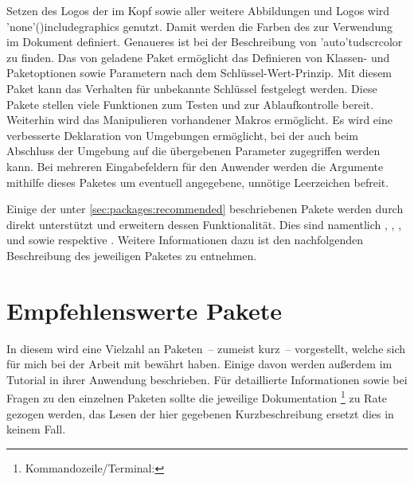 \begin{DeclarePackages}
  Setzen des Logos der \TnUD im Kopf sowie aller weitere Abbildungen und Logos 
  wird \Macro'none'(){includegraphics} genutzt.
  Damit werden die Farben des \CDs zur Verwendung im Dokument definiert. 
  Genaueres ist bei der Beschreibung von \Package'auto'{tudscrcolor} zu finden. 
  Das von  geladene Paket  ermöglicht das 
  Definieren von Klassen- und Paketoptionen sowie Parametern nach dem 
  Schlüssel-Wert-Prinzip. Mit diesem Paket kann das Verhalten für unbekannte 
  Schlüssel festgelegt werden.
  Diese Pakete stellen viele Funktionen zum Testen und zur Ablaufkontrolle 
  bereit. Weiterhin wird das Manipulieren vorhandener Makros ermöglicht.
  Es wird eine verbesserte Deklaration von Umgebungen ermöglicht, bei der auch 
  beim Abschluss der Umgebung auf die übergebenen Parameter zugegriffen werden 
  kann. 
  Bei mehreren Eingabefeldern für den Anwender werden die Argumente mithilfe 
  dieses Paketes um eventuell angegebene, unnötige Leerzeichen befreit.
\end{DeclarePackages}



Einige der unter \autoref{sec:packages:recommended} beschriebenen Pakete werden 
durch \TUDScript direkt unterstützt und erweitern dessen Funktionalität. Dies
sind namentlich , , , 
 und  sowie  respektive 
. Weitere Informationen dazu ist den nachfolgenden 
Beschreibung des jeweiligen Paketes zu entnehmen.



\section{%
  Empfehlenswerte Pakete%
  \label{sec:packages:recommended}%
}

In diesem \autorefname wird eine Vielzahl an Paketen~-- zumeist kurz~-- 
vorgestellt, welche sich für mich bei der Arbeit mit  bewährt 
haben. Einige davon werden außerdem im Tutorial  in 
ihrer Anwendung beschrieben. Für detaillierte Informationen sowie bei Fragen zu 
den einzelnen Paketen sollte die jeweilige Dokumentation%
\footnote{Kommandozeile/Terminal: }
zu Rate gezogen werden, das Lesen der hier gegebenen Kurzbeschreibung ersetzt 
dies in keinem Fall.



